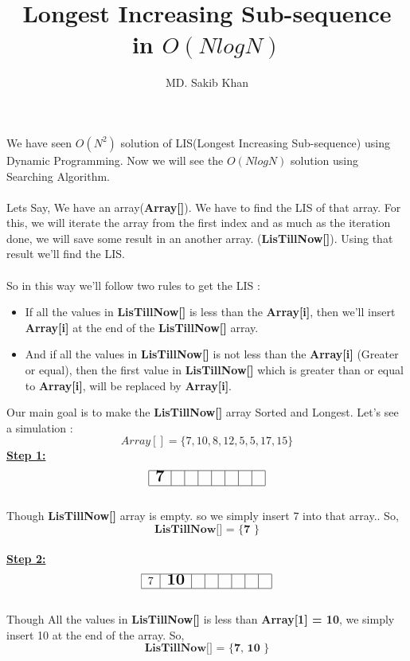 \documentclass[12pt]{article}
\title{Longest Increasing Sub-sequence \\in $O(NlogN)$ }
\author{MD. Sakib Khan}
\begin{document}
\maketitle
We have seen $O(N^2)$ solution of LIS(Longest Increasing Sub-sequence) using Dynamic Programming. Now we will see the $O(NlogN)$ solution using Searching Algorithm.\\
\\
Lets Say, We have an array(\textbf{Array[]}). We have to find the LIS of that array. For this, we will iterate the array from the first index and as much as the iteration done, we will save some result in an another array. (\textbf{LisTillNow[]}). Using that result we'll find the LIS. \\
\\
So in this way we'll follow two rules to get the LIS :
\begin{itemize}
  \item If all the values in \textbf{LisTillNow[]} is less than the   \textbf{Array[i]}, then we'll insert \textbf{Array[i]} at the end of the \textbf{LisTillNow[]} array.
  \item And if all the values in \textbf{LisTillNow[]} is not less than the \textbf{Array[i]} (Greater or equal), then the first value in \textbf{LisTillNow[]} which is greater than or equal to \textbf{Array[i]}, will be replaced by \textbf{Array[i]}.
\end{itemize}
Our main goal is to make the \textbf{LisTillNow[]} array Sorted and Longest.
\newpage
Let's see a simulation :
\Large{$$ Array[] = \{7,10,8,12,5,5,17,15\} $$}
\large{\textbf{\underline{Step 1:}}} 
$$
\begin{tabular}{|c|c|c|c|c|c|c|c|} \hline
     \Large{\textbf{7}} & & & & & & &  \\ \hline
\end{tabular} 
$$ \\
\normalsize{Though \textbf{LisTillNow[]} array is empty. so we simply insert 7 into that array.}. So, $$ \textbf{LisTillNow[] = \{ 7 \}} $$
\\
\large{\textbf{\underline{Step 2:}}} 
$$
\begin{tabular}{|c|c|c|c|c|c|c|c|} \hline
     7 & \Large{\textbf{10}} & & & & & &  \\ \hline
\end{tabular}
$$ \\
\normalsize{Though All the values in \textbf{LisTillNow[]} is less than \textbf{Array[1] = 10}, we simply insert 10 at the end of the array}. So, $$ \textbf{LisTillNow[] = \{ 7, 10 \}} $$
\end{document}
